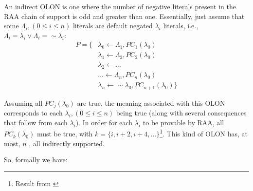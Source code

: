 An indirect OLON is one where the number of negative literals present in the RAA chain of support is odd and greater than one. Essentially, just assume that some $\Lambda_{i}, \left(0\leq i\leq n\right)$ literals are default negated $\lambda_{i}$ literals, i.e., $\Lambda_{i}=\lambda_{i}\vee\Lambda_{i}=\sim\lambda_{i}$:
\begin{align*}
P=\{ &\lambda_{0}  \leftarrow \Lambda_{1}, PC_{1}\left(\lambda_{0}\right)\\
&\lambda_{1}  \leftarrow \Lambda_{2}, PC_{2}\left(\lambda_{0}\right)\\
&\lambda_{2}  \leftarrow \ldots\\
&\ldots  \leftarrow \Lambda_{n}, PC_{n}\left(\lambda_{0}\right)\\
&\lambda_{n}  \leftarrow \sim\lambda_{0}, PC_{n+1}\left(\lambda_{0}\right)\}
\end{align*}

Assuming all $PC_{j}\left(\lambda_{0}\right)$ are true, the meaning associated with this OLON corresponds to each $\lambda_{i}, \left(0\leq i\leq n\right)$ being true (along with several consequences that follow from each $\lambda_{i}$). In order for each $\lambda_{i}$ to be provable by RAA, all $PC_{k}\left(\lambda_{0}\right)$ must be true, with $k=\{i,i+2,i+4,\ldots\}$\footnote{Result from \cite{ampMSc}}. This kind of OLON has, at most, $n$ \rsms, all indirectly supported.

So, formally we have:

